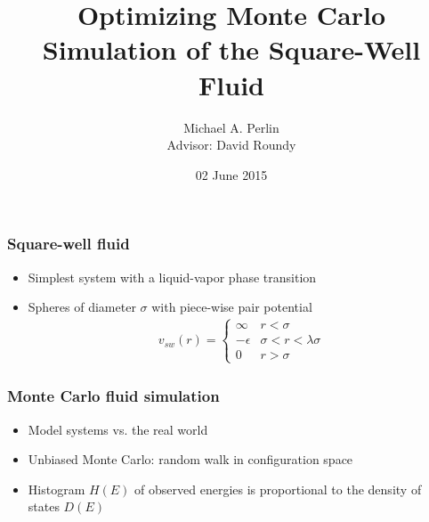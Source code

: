 \documentclass{beamer}
\title[Optimizing MC Simulation of the SW Fluid]
{Optimizing Monte Carlo Simulation of the Square-Well Fluid}
\author[M. A. Perlin, D. Roundy]
{Michael A. Perlin\\Advisor: David Roundy}
\institute{\bf Department of Physics, Oregon State University}
\date{02 June 2015}
\newcommand{\p}[1]{\left(#1\right)} %
\let\olditem\item
\renewcommand{\item}{\setlength{\itemsep}{6pt}\olditem}
\begin{document}
\begin{frame}
  \maketitle
\end{frame}


\begin{frame}
  \frametitle{Square-well fluid}
  \begin{itemize}
  \item Simplest system with a liquid-vapor phase transition
  \item Spheres of diameter $\sigma$ with piece-wise pair potential
  \begin{align*}
    v_{sw}\p{r}=\left\{
      \begin{array}{ll}
        \infty & r<\sigma \\
        -\epsilon & \sigma<r<\lambda\sigma \\
        0 & r>\sigma
      \end{array}
    \right.
  \end{align*}
  \end{itemize}
\end{frame}


\begin{frame}
  \frametitle{Monte Carlo fluid simulation}
  \begin{itemize}
  \item Model systems vs. the real world
  \item<2-> Unbiased Monte Carlo: random walk in configuration space
  \item<3> Histogram $H\p{E}$ of observed energies is proportional to
    the density of states $D\p{E}$
  \end{itemize}
\end{frame}
\end{document}
